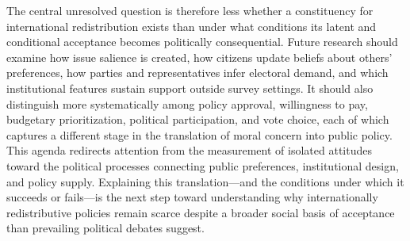 The central unresolved question is therefore less whether a constituency for international redistribution exists than under what conditions its latent and conditional acceptance becomes politically consequential. Future research should examine how issue salience is created, how citizens update beliefs about others' preferences, how parties and representatives infer electoral demand, and which institutional features sustain support outside survey settings. It should also distinguish more systematically among policy approval, willingness to pay, budgetary prioritization, political participation, and vote choice, each of which captures a different stage in the translation of moral concern into public policy. This agenda redirects attention from the measurement of isolated attitudes toward the political processes connecting public preferences, institutional design, and policy supply. Explaining this translation---and the conditions under which it succeeds or fails---is the next step toward understanding why internationally redistributive policies remain scarce despite a broader social basis of acceptance than prevailing political debates suggest.


